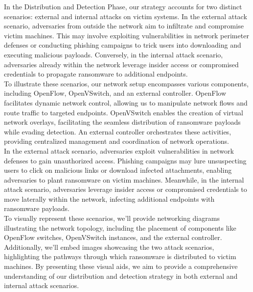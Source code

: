 \documentclass[12pt,twocolumn]{article}
\begin{document}
In the Distribution and Detection Phase, our strategy accounts for two distinct scenarios: external and internal attacks on victim systems. In the external attack scenario, adversaries from outside the network aim to infiltrate and compromise victim machines. This may involve exploiting vulnerabilities in network perimeter defenses or conducting phishing campaigns to trick users into downloading and executing malicious payloads. Conversely, in the internal attack scenario, adversaries already within the network leverage insider access or compromised credentials to propagate ransomware to additional endpoints.
\\
To illustrate these scenarios, our network setup encompasses various components, including OpenFlow, OpenVSwitch, and an external controller. OpenFlow facilitates dynamic network control, allowing us to manipulate network flows and route traffic to targeted endpoints. OpenVSwitch enables the creation of virtual network overlays, facilitating the seamless distribution of ransomware payloads while evading detection. An external controller orchestrates these activities, providing centralized management and coordination of network operations.
\\
In the external attack scenario, adversaries exploit vulnerabilities in network defenses to gain unauthorized access. Phishing campaigns may lure unsuspecting users to click on malicious links or download infected attachments, enabling adversaries to plant ransomware on victim machines. Meanwhile, in the internal attack scenario, adversaries leverage insider access or compromised credentials to move laterally within the network, infecting additional endpoints with ransomware payloads.
\\
To visually represent these scenarios, we'll provide networking diagrams illustrating the network topology, including the placement of components like OpenFlow switches, OpenVSwitch instances, and the external controller. Additionally, we'll embed images showcasing the two attack scenarios, highlighting the pathways through which ransomware is distributed to victim machines. By presenting these visual aids, we aim to provide a comprehensive understanding of our distribution and detection strategy in both external and internal attack scenarios.
\\
\end{document}
